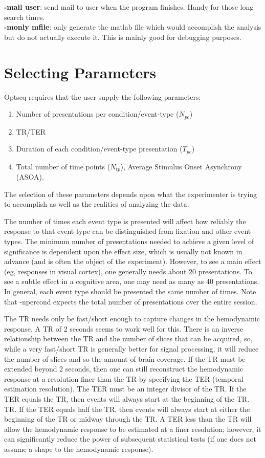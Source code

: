 \documentclass[10pt]{article}
\begin{document}
\noindent
{\bf -mail user}: send mail to user when the program finishes.  Handy
for those long search times.\\

\noindent
{\bf -monly mfile}: only generate the matlab file which would accomplish the
analysis but do not actually execute it.  This is mainly good for
debugging purposes.\\

\section{Selecting Parameters}

Optseq requires that the user supply the following parameters: 
\begin{enumerate}
\item Number of presentations per condition/event-type ($N_{pc}$)
\item TR/TER
\item Duration of each condition/event-type presentation ($T_{pc}$)
\item Total number of time points ($N_{tp}$), Average Stimulus Onset
Asynchrony (ASOA).
\end{enumerate}

The selection of these parameters depends upon what the experimenter
is trying to accomplish as well as the realities of analyzing the
data.

The number of times each event type is presented will affect how
reliably the response to that event type can be distinguished from
fixation and other event types. The minimum number of presentations
needed to achieve a given level of significance is dependent upon the
effect size, which is usually not known in advance (and is often the
object of the experiment). However, to see a main effect (eg,
responses in visual cortex), one generally needs about 20
presentations. To see a subtle effect in a cognitive area, one may need
as many as 40 presentations. In general, each event type should be
presented the same number of times. Note that -npercond expects the
total number of presentations over the entire session.

The TR needs only be fast/short enough to capture changes in the
hemodynamic response. A TR of 2 seconds seems to work well for this.
There is an inverse relationship between the TR and the number of
slices that can be acquired, so, while a very fast/short TR is
generally better for signal processing, it will reduce the number of
slices and so the amount of brain coverage. If the TR must be extended
beyond 2 seconds, then one can still reconstruct the hemodynamic
response at a resolution finer than the TR by specifying the TER
(temporal estimation resolution). The TER must be an integer divisor
of the TR. If the TER equals the TR, then events will always start at
the beginning of the TR.  TR. If the TER equals half the TR, then
events will always start at either the beginning of the TR or midway
through the TR. A TER less than the TR will allow the hemodynamic
response to be estimated at a finer resolution; however, it can
significantly reduce the power of subsequent statistical tests (if one
does not assume a shape to the hemodynamic response).
\end{document}
